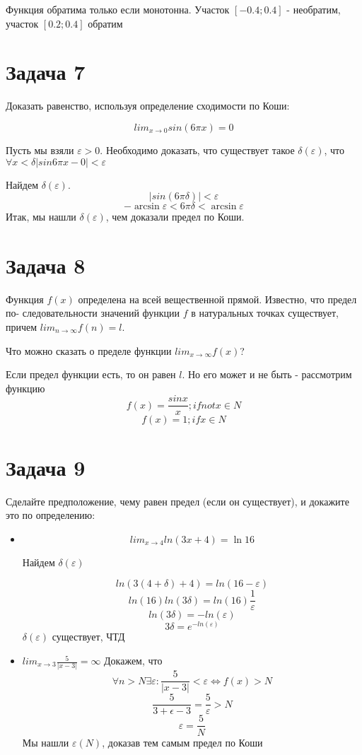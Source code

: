 \documentclass[11pt]{article}
\begin{document}
Функция обратима только если монотонна. Участок $[-0.4;0.4]$ - необратим, участок $[0.2;0.4]$ обратим

\section{Задача 7}
Доказать равенство, используя определение сходимости по Коши:

$$lim_{x\to 0}sin(6\pi x) = 0$$

Пусть мы взяли $\varepsilon >0$. Необходимо доказать, что существует такое $\delta(\varepsilon)$, что $\forall  x < \delta |sin 6\pi x -0|<\varepsilon$

Найдем $\delta(\varepsilon)$. 
$$|sin(6\pi \delta)| < \varepsilon$$
$$-\arcsin{\varepsilon}<6\pi\delta < \arcsin{\varepsilon}$$
Итак, мы нашли $\delta(\varepsilon)$, чем доказали предел по Коши.

\section{Задача 8}
 Функция $f(x)$ определена на всей вещественной прямой. Известно, что предел по-
следовательности значений функции $f$ в натуральных точках существует, причем $lim_{n\to \infty}f(n) = l$.

Что можно сказать о пределе функции $lim _{x\to\infty}f(x)$?

Если предел функции есть, то он равен $l$. Но его может и не быть - рассмотрим функцию 
$$f(x) = \frac{sin x}{x}; if  not x \in N$$
$$f(x) = 1; if x \in N$$


\section{Задача 9}
 Сделайте предположение, чему равен предел (если он существует), и докажите это
по определению:
\begin{itemize}
\item $$lim_{x\to4}ln(3x + 4) =\ln 16$$

Найдем $\delta(\varepsilon)$

$$ln(3(4+\delta)+4) = ln(16-\varepsilon)$$
$$ln(16)ln(3\delta) = ln(16)\frac{1}{\varepsilon}$$
$$ln(3\delta) = -ln(\varepsilon)$$
$$3\delta = e^{-ln(\varepsilon)}$$
$\delta(\varepsilon)$ существует, ЧТД

\item $lim_{x\to3}\frac5{|x-3|} = \infty$
Докажем, что $$\forall  n>N \exists \varepsilon :\frac5{|x-3|}<\varepsilon \Leftrightarrow f(x)>N$$
$$\frac{5}{3+\epsilon-3} = \frac 5{\varepsilon} > N$$
$$\varepsilon = \frac 5N$$
Мы нашли $\varepsilon(N)$, доказав тем самым предел по Коши
















\end{itemize}
\end{document}
